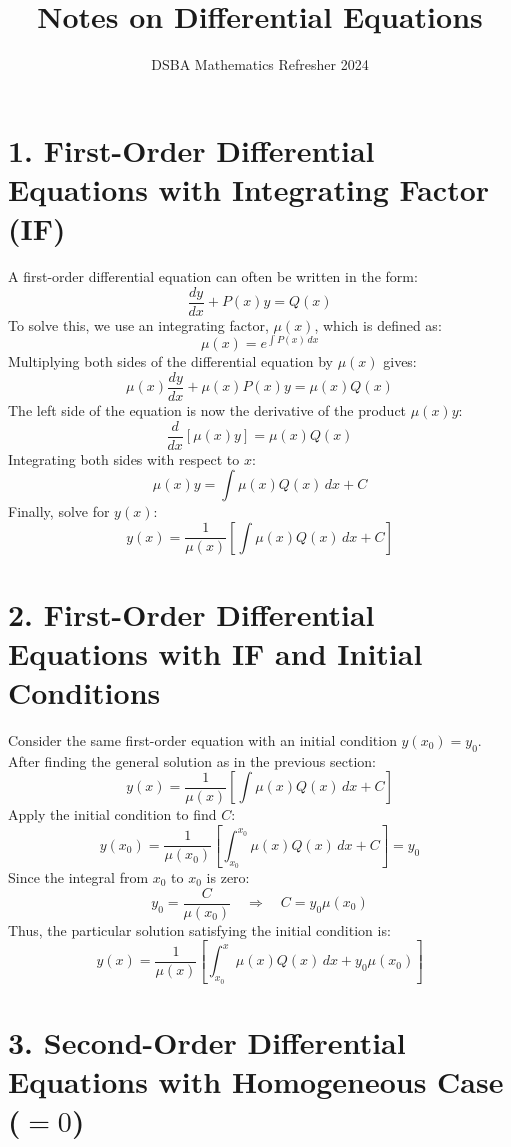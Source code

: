 \documentclass[]{article}
\title{Notes on Differential Equations}
\author{DSBA Mathematics Refresher 2024}
\date{}
\begin{document}
	
	\maketitle
	
	\begin{abstract}
		
	\end{abstract}
	
	
	\section*{1. First-Order Differential Equations with Integrating Factor (IF)}
	
	A first-order differential equation can often be written in the form:
	\[
	\frac{dy}{dx} + P(x)y = Q(x)
	\]
	To solve this, we use an integrating factor, $\mu(x)$, which is defined as:
	\[
	\mu(x) = e^{\int P(x) \, dx}
	\]
	Multiplying both sides of the differential equation by $\mu(x)$ gives:
	\[
	\mu(x) \frac{dy}{dx} + \mu(x)P(x)y = \mu(x)Q(x)
	\]
	The left side of the equation is now the derivative of the product $\mu(x)y$:
	\[
	\frac{d}{dx}\left[\mu(x)y\right] = \mu(x)Q(x)
	\]
	Integrating both sides with respect to $x$:
	\[
	\mu(x)y = \int \mu(x)Q(x) \, dx + C
	\]
	Finally, solve for $y(x)$:
	\[
	y(x) = \frac{1}{\mu(x)}\left[\int \mu(x)Q(x) \, dx + C\right]
	\]
	
	\section*{2. First-Order Differential Equations with IF and Initial Conditions}
	
	Consider the same first-order equation with an initial condition $y(x_0) = y_0$. After finding the general solution as in the previous section:
	\[
	y(x) = \frac{1}{\mu(x)}\left[\int \mu(x)Q(x) \, dx + C\right]
	\]
	Apply the initial condition to find $C$:
	\[
	y(x_0) = \frac{1}{\mu(x_0)}\left[\int_{x_0}^{x_0} \mu(x)Q(x) \, dx + C\right] = y_0
	\]
	Since the integral from $x_0$ to $x_0$ is zero:
	\[
	y_0 = \frac{C}{\mu(x_0)} \quad \Rightarrow \quad C = y_0 \mu(x_0)
	\]
	Thus, the particular solution satisfying the initial condition is:
	\[
	y(x) = \frac{1}{\mu(x)}\left[\int_{x_0}^{x} \mu(x)Q(x) \, dx + y_0 \mu(x_0)\right]
	\]
	
	\section*{3. Second-Order Differential Equations with Homogeneous Case ($=0$)}
	
\end{document}
